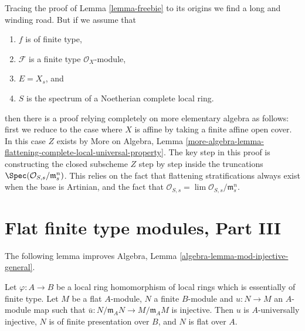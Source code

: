 \begin{remark}
\label{remark-flattening-complete-noetherian}
Tracing the proof of
Lemma \ref{lemma-freebie}
to its origins we find a long and winding road. But if we assume that
\begin{enumerate}
\item $f$ is of finite type,
\item $\mathcal{F}$ is a finite type $\mathcal{O}_X$-module,
\item $E = X_s$, and
\item $S$ is the spectrum of a Noetherian complete local ring.
\end{enumerate}
then there is a proof relying completely on more elementary algebra as
follows: first we reduce to the case where $X$ is affine by taking
a finite affine open cover. In this case $Z$ exists by
More on Algebra,
Lemma \ref{more-algebra-lemma-flattening-complete-local-universal-property}.
The key step in this proof is constructing the closed subscheme $Z$
step by step inside the truncations
$\Spec(\mathcal{O}_{S, s}/\mathfrak m_s^n)$.
This relies on the fact that flattening stratifications always exist
when the base is Artinian, and the fact that
$\mathcal{O}_{S, s} = \lim \mathcal{O}_{S, s}/\mathfrak m_s^n$.
\end{remark}




\section{Flat finite type modules, Part III}
\label{section-finite-type-flat-III}

\noindent
The following lemma improves
Algebra, Lemma \ref{algebra-lemma-mod-injective-general}.

\begin{lemma}
\label{lemma-finite-type-injective-into-flat-mod-m}
Let $\varphi : A \to B$ be a local ring homomorphism of local rings
which is essentially of finite type. Let $M$ be a flat $A$-module,
$N$ a finite $B$-module and $u : N \to M$ an $A$-module map such that
$\overline{u} : N/\mathfrak m_AN \to M/\mathfrak m_AM$ is injective.
Then $u$ is $A$-universally injective, $N$ is of finite presentation over
$B$, and $N$ is flat over $A$.
\end{lemma}

